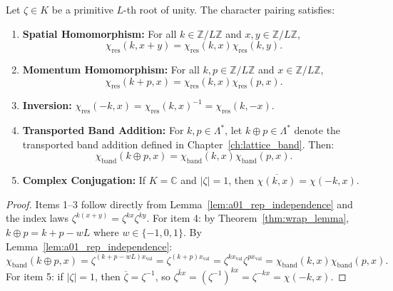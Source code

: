 \begin{theorem}
\label{thm:character_homomorphisms}
Let $\zeta \in K$ be a primitive $L$-th root of unity. The character pairing satisfies:
\begin{enumerate}
    \item \textbf{Spatial Homomorphism:} For all $k \in \mathbb{Z}/L\mathbb{Z}$ and $x, y \in \mathbb{Z}/L\mathbb{Z}$,
    \begin{equation}
    \chi_{\mathrm{res}}(k, x + y) = \chi_{\mathrm{res}}(k, x) \chi_{\mathrm{res}}(k, y).
    \end{equation}
    \item \textbf{Momentum Homomorphism:} For all $k, p \in \mathbb{Z}/L\mathbb{Z}$ and $x \in \mathbb{Z}/L\mathbb{Z}$,
    \begin{equation}
    \chi_{\mathrm{res}}(k + p, x) = \chi_{\mathrm{res}}(k, x) \chi_{\mathrm{res}}(p, x).
    \end{equation}
    \item \textbf{Inversion:} $\chi_{\mathrm{res}}(-k, x) = \chi_{\mathrm{res}}(k, x)^{-1} = \chi_{\mathrm{res}}(k, -x)$.
    \item \textbf{Transported Band Addition:} For $k, p \in \Lambda^*$, let $k \oplus p \in \Lambda^*$ denote the transported band addition defined in Chapter~\ref{ch:lattice_band}. Then:
    \begin{equation}
    \chi_{\mathrm{band}}(k \oplus p, x) = \chi_{\mathrm{band}}(k, x) \chi_{\mathrm{band}}(p, x).
    \end{equation}
    \item \textbf{Complex Conjugation:} If $K = \mathbb{C}$ and $|\zeta| = 1$, then $\overline{\chi(k, x)} = \chi(-k, x)$.
\end{enumerate}
\end{theorem}

\begin{proof}
Items 1--3 follow directly from Lemma~\ref{lem:a01_rep_independence} and the index laws $\zeta^{k(x+y)} = \zeta^{kx}\zeta^{ky}$.
For item 4: by Theorem~\ref{thm:wrap_lemma}, $k \oplus p = k + p - w L$ where $w \in \{-1, 0, 1\}$.
By Lemma~\ref{lem:a01_rep_independence}:
\[
\chi_{\mathrm{band}}(k \oplus p, x) = \zeta^{(k + p - w L) x_{\mathrm{val}}} = \zeta^{(k+p) x_{\mathrm{val}}} = \zeta^{k x_{\mathrm{val}}} \zeta^{p x_{\mathrm{val}}} = \chi_{\mathrm{band}}(k, x) \chi_{\mathrm{band}}(p, x).
\]
For item 5: if $|\zeta| = 1$, then $\overline{\zeta} = \zeta^{-1}$, so $\overline{\zeta^{kx}} = (\zeta^{-1})^{kx} = \zeta^{-kx} = \chi(-k, x)$.
\end{proof}

